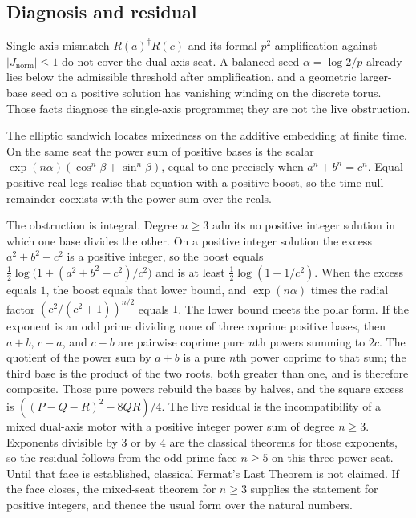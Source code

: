 \documentclass[a4paper]{article}
\theoremstyle{definition}
\theoremstyle{remark}
\newcommand{\Jnorm}{J_{\mathrm{norm}}}
\begin{document}
\subsection{Diagnosis and residual}

Single-axis mismatch \(R(a)^\dagger R(c)\) and its formal \(p^2\) amplification against \(|\Jnorm|\le 1\) do not cover the dual-axis seat. A balanced seed \(\alpha=\log 2/p\) already lies below the admissible threshold after amplification, and a geometric larger-base seed on a positive solution has vanishing winding on the discrete torus. Those facts diagnose the single-axis programme; they are not the live obstruction.

The elliptic sandwich locates mixedness on the additive embedding at finite time. On the same seat the power sum of positive bases is the scalar \(\exp(n\alpha)(\cos^n\beta+\sin^n\beta)\), equal to one precisely when \(a^n+b^n=c^n\). Equal positive real legs realise that equation with a positive boost, so the time-null remainder coexists with the power sum over the reals.

The obstruction is integral. Degree \(n\ge 3\) admits no positive integer solution in which one base divides the other. On a positive integer solution the excess \(a^2+b^2-c^2\) is a positive integer, so the boost equals \(\frac12\log\bigl(1+(a^2+b^2-c^2)/c^2\bigr)\) and is at least \(\frac12\log(1+1/c^2)\). When the excess equals \(1\), the boost equals that lower bound, and \(\exp(n\alpha)\) times the radial factor \((c^2/(c^2+1))^{n/2}\) equals \(1\). The lower bound meets the polar form. If the exponent is an odd prime dividing none of three coprime positive bases, then \(a+b\), \(c-a\), and \(c-b\) are pairwise coprime pure \(n\)th powers summing to \(2c\). The quotient of the power sum by \(a+b\) is a pure \(n\)th power coprime to that sum; the third base is the product of the two roots, both greater than one, and is therefore composite. Those pure powers rebuild the bases by halves, and the square excess is \(((P-Q-R)^2-8QR)/4\). The live residual is the incompatibility of a mixed dual-axis motor with a positive integer power sum of degree \(n\ge 3\). Exponents divisible by \(3\) or by \(4\) are the classical theorems for those exponents, so the residual follows from the odd-prime face \(n\ge 5\) on this three-power seat. Until that face is established, classical Fermat's Last Theorem is not claimed. If the face closes, the mixed-seat theorem for \(n\ge 3\) supplies the statement for positive integers, and thence the usual form over the natural numbers.
\end{document}
